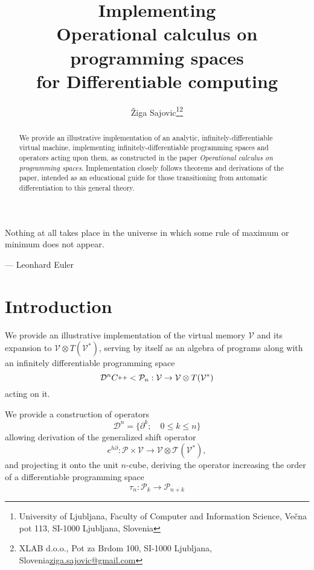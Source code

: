 \documentclass{article}
\title{Implementing \\ Operational calculus on programming spaces \\ for Differentiable computing}
\author{Žiga Sajovic\footnote{University of Ljubljana, Faculty of Computer and Information
  Science,  Večna pot 113, SI-1000 Ljubljana, Slovenia}\footnote{XLAB d.o.o., Pot za Brdom 100, SI-1000 Ljubljana, Slovenia\newline \href{mail.to:ziga.sajovic@xlab.si}{ziga.sajovic@gmail.com}}}
\newcommand{\T}{\mathcal{T}}
\newcommand{\VV}{\mathcal{V}}
\newcommand{\CC}{C\nolinebreak\hspace{-.05em}\raisebox{.4ex}{\tiny\bf +}\nolinebreak\hspace{-.10em}\raisebox{.4ex}{\tiny\bf +}}
\def\CC{{C\nolinebreak[4]\hspace{-.05em}\raisebox{.4ex}{\tiny\bf ++}}}
\newcommand{\dP}{\mathcal{P}}
\newcommand{\D}{\partial}
\newcommand{\DD}{\mathcal{D}}
\newcommand{\sumd}{\tau}
\begin{document}
\maketitle

\begin{abstract}
We provide an illustrative implementation of an analytic, infinitely-differentiable virtual machine, implementing infinitely-differentiable programming spaces and operators acting upon them, as constructed in the paper \emph{Operational calculus on programming spaces}\cite{OperationalCalculus}. Implementation closely follows theorems and derivations of the paper, intended as an educational guide for those transitioning from automatic differentiation to this general theory.

\end{abstract}

\epigraph{Nothing at all takes place in the universe in which some rule of maximum or minimum does not appear.}{--- \textup{Leonhard Euler}}

\clearpage

\tableofcontents
\clearpage
\section{Introduction}\label{sec:introduction}
We provide an illustrative implementation of the virtual memory $\VV$ and its expansion to $\VV\otimes T(\VV^*)$, serving by itself as an algebra of programs along with an infinitely differentiable programming space \cite[Theorem~14]{OperationalCalculus}
\begin{equation}
\DD^n\CC<\dP_n:\VV\to\VV\otimes T(\VV^*)
\end{equation}
acting on it.

We provide a construction of operators
\begin{equation}
\DD^n=\{\D^k;\quad 0\le k\le n\}
\end{equation}
allowing derivation of the generalized shift operator \cite[Theorem~17]{OperationalCalculus}
 \begin{equation}
                  	e^{h\D}:\dP\times \VV\to \VV\otimes \T(\VV^*),
         \end{equation}
and projecting it onto the unit $n$-cube, deriving the operator increasing the order of a differentiable programming space \cite[Proposition~11]{OperationalCalculus}
\begin{equation}\label{eq:sumd}
\sumd_n:\dP_k\to\dP_{n+k}
\end{equation} 
\end{document}
